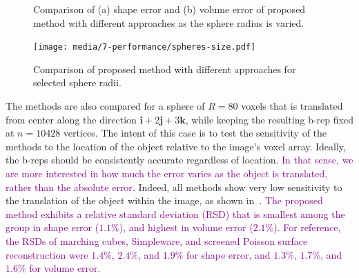 \begin{figure}[ht!]
	\centering
	\caption{Comparison of (a) shape error and (b) volume error of proposed method with different approaches as the sphere radius is varied.}
	\label{fig:graph2}
\end{figure}
\begin{figure}[h!]
	\centering
	\texttt{[image: media/7-performance/spheres-size.pdf]}
	\caption{Comparison of proposed method with different approaches for selected sphere radii.}
	\label{fig:demos2}
\end{figure}
%
\noindent The methods are also compared for a sphere of $R = 80$ voxels that is translated from center along the direction $\bm{i}  + 2\bm{j} + 3\bm{k}$, while keeping the resulting b-rep fixed at $n = 10428$ vertices. The intent of this case is to test the sensitivity of the methods to the location of the object relative to the image's voxel array. Ideally, the b-reps should be consistently accurate regardless of location. \textcolor{purple}{In that sense, we are more interested in how much the error varies as the object is translated, rather than the absolute error.} Indeed, all methods show very low sensitivity to the translation of the object within the image, as shown in~. \textcolor{purple}{The proposed method exhibits a relative standard deviation (RSD) that is smallest among the group in shape error ($1.1\%$), and highest in volume error ($2.1\%$). For reference, the RSDs of marching cubes, Simpleware, and screened Poisson surface reconstruction were $1.4\%$, $2.4\%$, and $1.9\%$ for shape error, and $1.3\%$, $1.7\%$, and $1.6\%$ for volume error.} \\

